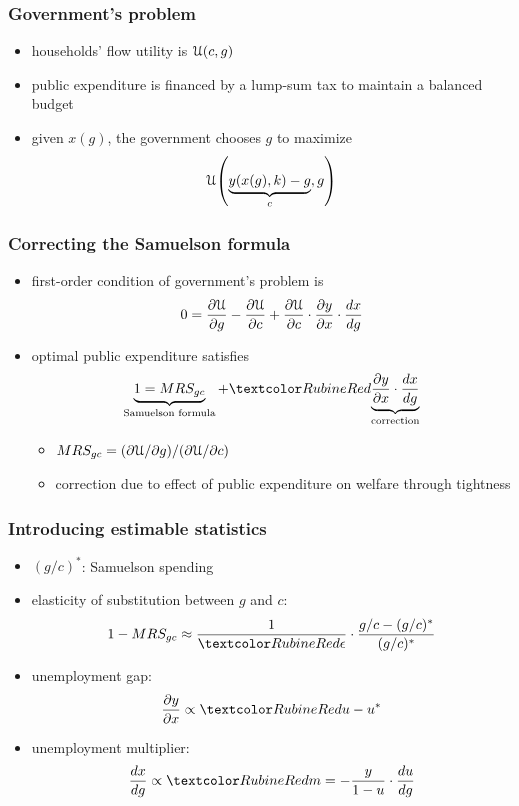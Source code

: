 \documentclass[12pt,xcolor={dvipsnames},hyperref={pdftex,pdfpagemode=UseNone,hidelinks,pdfdisplaydoctitle=true},usepdftitle=false]{beamer}
\begin{document}
\begin{frame}
\end{frame}

\begin{frame}
\frametitle{Government's problem}
\begin{itemize}
\item households' flow utility is $\mathcal{U}(c,g)$
\item public expenditure is financed by a lump-sum tax to maintain a balanced budget
\item given $x(g)$, the government chooses $g$ to maximize 
\begin{equation*}
\mathcal{U}{\left( \underbrace{y(x(g),k)-g}_{c},g \right)}
\end{equation*}
\end{itemize}
\end{frame}

\begin{frame}
\frametitle{Correcting the Samuelson formula}
\begin{itemize}
\item first-order condition of government's problem is
\begin{equation*}
0 =\frac{\partial \mathcal{U}}{\partial g}-\frac{\partial \mathcal{U}}{\partial c}+\frac{\partial \mathcal{U}}{\partial c}\cdot \frac{\partial y}{\partial x} \cdot \frac{d x}{d g}
\end{equation*}
\item optimal public expenditure satisfies
\begin{equation*}
\underbrace{1 = MRS_{gc}}_{\text{Samuelson formula}}+ \al{\underbrace{\pd{y}{x} \cdot \od{x}{g}}_{\text{correction}}}
\end{equation*}
\begin{itemize}
\item $MRS_{gc} = (\partial \mathcal{U}/\partial g)/(\partial \mathcal{U}/\partial c)$ 	
\item correction due to effect of public expenditure on welfare through tightness
\end{itemize}
\end{itemize}
\end{frame}


\begin{frame}
\frametitle{Introducing estimable statistics}
\begin{itemize}
\item $(g/c)^{*}$: Samuelson spending
\item elasticity of substitution between $g$ and $c$:
\begin{equation*}
1-MRS_{gc}  \approx \frac{1}{\al{\e}}\cdot \frac{g/c-(g/c)^*}{(g/c)^*}
\end{equation*}
\item unemployment gap:
\begin{equation*}
\pd{y}{x} \propto \al{u-u^{*}}
\end{equation*}
\item unemployment multiplier:
\begin{equation*}
\od{x}{g} \propto \al{m} = -\frac{y}{1-u}\cdot\od{u}{g}
\end{equation*}
\end{itemize}
\end{frame}
\end{document}
